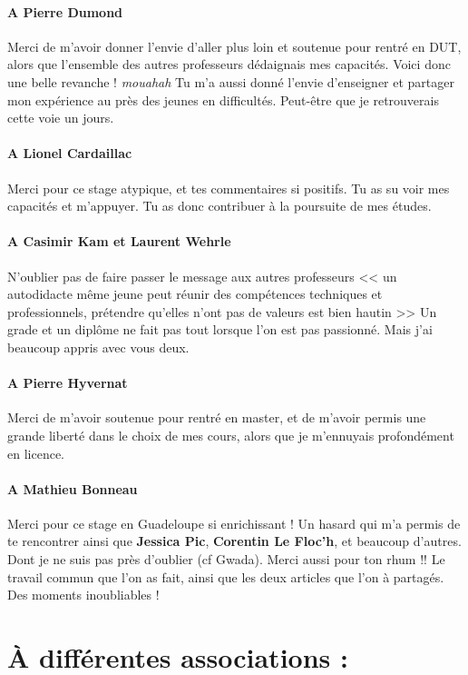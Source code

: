 \documentclass[../thesis.tex]{subfiles}
\begin{document}
\paragraph{A Pierre Dumond} Merci de m'avoir donner l'envie d'aller plus loin et soutenue pour rentré en DUT,
alors que l'ensemble des autres professeurs dédaignais mes capacités. Voici donc une belle revanche ! \textit{mouahah}
Tu m'a aussi donné l'envie d'enseigner et partager mon expérience au près des jeunes en difficultés.
Peut-être que je retrouverais cette voie un jours.

\paragraph{A Lionel Cardaillac} Merci pour ce stage atypique, et tes commentaires si positifs.
Tu as su voir mes capacités et m'appuyer. Tu as donc contribuer à la poursuite de mes études.

\paragraph{A Casimir Kam et Laurent Wehrle} N'oublier pas de faire passer le message aux autres professeurs <<
un autodidacte même jeune peut réunir des compétences techniques et professionnels, prétendre qu'elles n'ont pas de valeurs est bien hautin >>
Un grade et un diplôme ne fait pas tout lorsque l'on est pas passionné.
Mais j'ai beaucoup appris avec vous deux.

\paragraph{A Pierre Hyvernat} Merci de m'avoir soutenue pour rentré en master,
et de m'avoir permis une grande liberté dans le choix de mes cours,
alors que je m'ennuyais profondément en licence.

\paragraph{A Mathieu Bonneau} Merci pour ce stage en Guadeloupe si enrichissant !
Un hasard qui m'a permis de te rencontrer ainsi que \textbf{Jessica Pic}, \textbf{Corentin Le Floc'h}, et beaucoup d'autres.
Dont je ne suis pas près d'oublier (cf Gwada). Merci aussi pour ton rhum !! Le travail commun que l'on as fait, ainsi que les deux articles que l'on à partagés.
Des moments inoubliables !

\section*{À différentes associations :}
\end{document}

